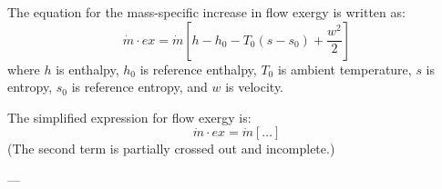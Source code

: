 The equation for the mass-specific increase in flow exergy is written as:  
\[
\dot{m} \cdot ex = \dot{m} \left[ h - h_0 - T_0 (s - s_0) + \frac{w^2}{2} \right]
\]  
where \( h \) is enthalpy, \( h_0 \) is reference enthalpy, \( T_0 \) is ambient temperature, \( s \) is entropy, \( s_0 \) is reference entropy, and \( w \) is velocity.  

The simplified expression for flow exergy is:  
\[
\dot{m} \cdot ex = \dot{m} \left[ \ldots \right]
\]  
(The second term is partially crossed out and incomplete.)

---